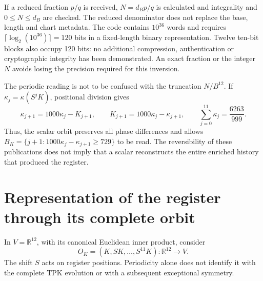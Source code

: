 If a reduced fraction \(p/q\) is received, \(N=d_Bp/q\) is calculated
and integrality and \(0\leq N\leq d_B\) are checked.
The reduced denominator does not replace the base, length and
chart metadata. The code contains \(10^{36}\) words and requires
\(\lceil\log_2(10^{36})\rceil=120\) bits in a fixed-length binary
representation. Twelve ten-bit blocks also occupy 120 bits: no
additional compression, authentication or cryptographic integrity has been
demonstrated. An exact fraction or the integer \(N\) avoids losing the
precision required for this inversion.

The periodic reading is not to be confused with the truncation \(N/B^{12}\). If \(\kappa_j=\kappa(S^jK)\), positional division gives
\begin{equation}
 \kappa_{j+1}=1000\kappa_j-K_{j+1},\qquad
 K_{j+1}=1000\kappa_j-\kappa_{j+1},\qquad
 \sum_{j=0}^{11}\kappa_j=\frac{6263}{999}.
 \label{x_reciprocidad:lib01:orbita-kappa}
\end{equation}
Thus, the scalar orbit preserves all phase differences and allows
\(B_K=\{j+1:1000\kappa_j-\kappa_{j+1}\geq729\}\) to be read.
The reversibility of these publications does not imply that a scalar
reconstructs the entire enriched history that produced the register.

\section{Representation of the register through its complete orbit}
\label{x_reciprocidad:lib01:orbita}

In \(V=\mathbb R^{12}\), with its canonical Euclidean inner product, consider
\[
 O_K=(K,SK,\ldots,S^{11}K):\mathbb R^{12}\longrightarrow V.
\]
The shift \(S\) acts on register positions. Periodicity
alone does not identify it with the complete TPK evolution or with
a subsequent exceptional symmetry.


